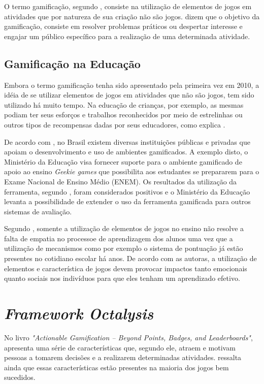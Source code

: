 O termo gamificação, segundo , consiste na utilização de elementos de jogos em 
atividades que por natureza de sua criação não são jogos.  dizem que o objetivo da gamificação, consiste em resolver
problemas práticos ou despertar interesse e engajar um público específico para a realização de uma determinada
atividade. 

\subsection{Gamificação na Educação}
Embora o termo gamificação tenha sido apresentado pela primeira vez em 2010, a idéia de se utilizar
elementos de jogos em atividades que não são jogos, tem sido utilizado há muito tempo. Na educação
de crianças, por exemplo, as mesmas podiam ter seus esforços e trabalhos reconhecidos por meio
de estrelinhas ou outros tipos de recompensas dadas por seus educadores, como explica .

De acordo com , no Brasil existem diversas instituições públicas e privadas que apoiam o desenvolvimento e uso de ambientes
gamificados. A exemplo disto, o Ministério da Educação visa fornecer suporte para o ambiente gamificado de apoio ao ensino \textit{Geekie games} que possibilita
aos estudantes se prepararem para o Exame Nacional de Ensino Médio (ENEM). Os resultados da utilização da ferramenta, segundo , 
foram considerados positivos e o Ministério da Educação levanta a possibilidade de extender o uso da ferramenta gamificada para outros sistemas de avaliação.

Segundo , somente a utilização de elementos de jogos no ensino não resolve a falta de empatia no processoe de aprendizagem dos alunos
uma vez que a utilização de mecanismos como por exemplo o sistema de pontuação já estão presentes no cotidiano escolar há anos. De acordo com as autoras, 
a utilização de elementos e característica de jogos devem provocar impactos tanto emocionais quanto sociais nos indivíduos para que eles tenham um aprendizado
efetivo. 

\section{\textit{Framework Octalysis}}
No livro \textit{"Actionable Gamification – Beyond Points, Badges, and Leaderboards"},  apresenta uma série
de características que, segundo ele, atraem e motivam pessoas a tomarem decisões e a realizarem determinadas atividades.
 ressalta ainda que essas características estão presentes na maioria dos jogos bem sucedidos.

